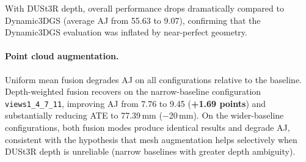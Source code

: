\documentclass[12pt, a4paper, oneside]{report}
\begin{document}
\begin{table}[htbp]
    \centering
    \caption{Evaluation with DUSt3R-estimated depth maps (online-computable from 4 target views only). Five SAM3D strategies are compared: uniform mean, depth-weighted multi-view fusion ($\alpha_d = 15.0$), kNN semantic bias (over-fetch $4\times$, $\lambda = 0.1$, $\tau = 0.15$), and the combination of kNN bias with depth-weighted augmentation. Bold indicates the best result per metric. All numbers are percentages except ATE (mm).}
    \label{tab:duster_results}
\end{table}

With DUSt3R depth, overall performance drops dramatically compared to Dynamic3DGS (average AJ from 55.63 to 9.07), confirming that the Dynamic3DGS evaluation was inflated by near-perfect geometry.

\paragraph{Point cloud augmentation.} Uniform mean fusion degrades AJ on all configurations relative to the baseline. Depth-weighted fusion recovers on the narrow-baseline configuration \texttt{views1\_4\_7\_11}, improving AJ from 7.76 to 9.45 (\textbf{+1.69 points}) and substantially reducing ATE to 77.39\,mm ($-$20\,mm). On the wider-baseline configurations, both fusion modes produce identical results and degrade AJ, consistent with the hypothesis that mesh augmentation helps selectively when DUSt3R depth is unreliable (narrow baselines with greater depth ambiguity).
\end{document}
